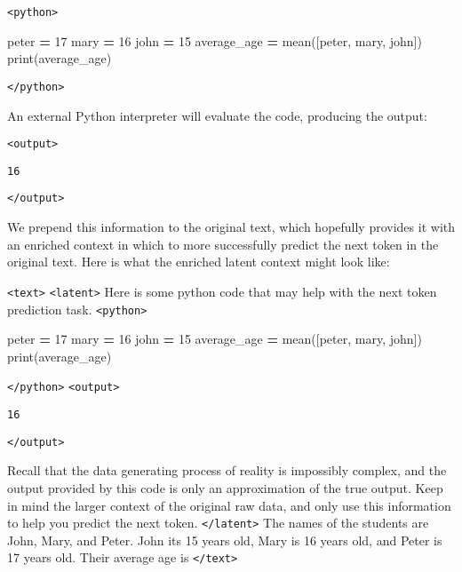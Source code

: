 \documentclass[
]{article}
\newenvironment{Shaded}{\begin{snugshade}}{\end{snugshade}}
\newcommand{\BuiltInTok}[1]{#1}
\newcommand{\DecValTok}[1]{\textcolor[rgb]{0.00,0.00,0.81}{#1}}
\newcommand{\NormalTok}[1]{#1}
\newcommand{\OperatorTok}[1]{\textcolor[rgb]{0.81,0.36,0.00}{\textbf{#1}}}
\begin{document}
\texttt{\textless{}python\textgreater{}}

\begin{Shaded}
\begin{Highlighting}[]
\NormalTok{peter }\OperatorTok{=} \DecValTok{17}
\NormalTok{mary }\OperatorTok{=} \DecValTok{16}
\NormalTok{john }\OperatorTok{=} \DecValTok{15}
\NormalTok{average\_age }\OperatorTok{=}\NormalTok{ mean([peter, mary, john])}
\BuiltInTok{print}\NormalTok{(average\_age)}
\end{Highlighting}
\end{Shaded}

\texttt{\textless{}/python\textgreater{}}

An external Python interpreter will evaluate the code, producing the
output:

\texttt{\textless{}output\textgreater{}}

\begin{verbatim}
16
\end{verbatim}

\texttt{\textless{}/output\textgreater{}}

We prepend this information to the original text, which hopefully
provides it with an enriched context in which to more successfully
predict the next token in the original text. Here is what the enriched
latent context might look like:

\texttt{\textless{}text\textgreater{}}
\texttt{\textless{}latent\textgreater{}} Here is some python code that
may help with the next token prediction task.
\texttt{\textless{}python\textgreater{}}

\begin{Shaded}
\begin{Highlighting}[]
\NormalTok{peter }\OperatorTok{=} \DecValTok{17}
\NormalTok{mary }\OperatorTok{=} \DecValTok{16}
\NormalTok{john }\OperatorTok{=} \DecValTok{15}
\NormalTok{average\_age }\OperatorTok{=}\NormalTok{ mean([peter, mary, john])}
\BuiltInTok{print}\NormalTok{(average\_age)}
\end{Highlighting}
\end{Shaded}

\texttt{\textless{}/python\textgreater{}}
\texttt{\textless{}output\textgreater{}}

\begin{verbatim}
16
\end{verbatim}

\texttt{\textless{}/output\textgreater{}}

Recall that the data generating process of reality is impossibly
complex, and the output provided by this code is only an approximation
of the true output. Keep in mind the larger context of the original raw
data, and only use this information to help you predict the next token.
\texttt{\textless{}/latent\textgreater{}} The names of the students are
John, Mary, and Peter. John its 15 years old, Mary is 16 years old, and
Peter is 17 years old. Their average age is
\texttt{\textless{}/text\textgreater{}}
\end{document}
